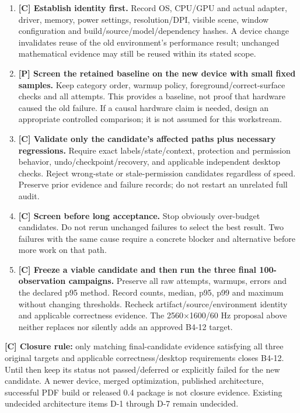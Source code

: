 \documentclass[10pt,a4paper]{article}
\makeatletter
\newcommand{\tightlist}{\setlength{\itemsep}{2pt}\setlength{\parskip}{0pt}}
\def\subsubsection{\@startsection{subsubsection}{3}{0pt}{-9pt}{4pt}{\sffamily\normalsize\bfseries\color{ink}}}
\makeatother
\begin{document}
\subsubsection{New-device validation sequence}\label{new-device-validation-sequence}

\begin{enumerate}
\def\labelenumi{\arabic{enumi}.}
\tightlist
\item
  \textbf{{[}C{]} Establish identity first.} Record OS, CPU/GPU and actual adapter, driver, memory, power settings, resolution/DPI, visible scene, window configuration and build/source/model/dependency hashes. A device change invalidates reuse of the old environment's performance result; unchanged mathematical evidence may still be reused within its stated scope.
\item
  \textbf{{[}P{]} Screen the retained baseline on the new device with small fixed samples.} Keep category order, warmup policy, foreground/correct-surface checks and all attempts. This provides a baseline, not proof that hardware caused the old failure. If a causal hardware claim is needed, design an appropriate controlled comparison; it is not assumed for this workstream.
\item
  \textbf{{[}C{]} Validate only the candidate's affected paths plus necessary regressions.} Require exact labels/state/context, protection and permission behavior, undo/checkpoint/recovery, and applicable independent desktop checks. Reject wrong-state or stale-permission candidates regardless of speed. Preserve prior evidence and failure records; do not restart an unrelated full audit.
\item
  \textbf{{[}C{]} Screen before long acceptance.} Stop obviously over-budget candidates. Do not rerun unchanged failures to select the best result. Two failures with the same cause require a concrete blocker and alternative before more work on that path.
\item
  \textbf{{[}C{]} Freeze a viable candidate and then run the three final 100-observation campaigns.} Preserve all raw attempts, warmups, errors and the declared p95 method. Record counts, median, p95, p99 and maximum without changing thresholds. Recheck artifact/source/environment identity and applicable correctness evidence. The 2560\(\times\)1600/60 Hz proposal above neither replaces nor silently adds an approved B4-12 target.
\end{enumerate}

\textbf{{[}C{]} Closure rule:} only matching final-candidate evidence satisfying all three original targets and applicable correctness/desktop requirements closes B4-12. Until then keep its status not passed/deferred or explicitly failed for the new candidate. A newer device, merged optimization, published architecture, successful PDF build or released 0.4 package is not closure evidence. Existing undecided architecture items D-1 through D-7 remain undecided.
\end{document}
